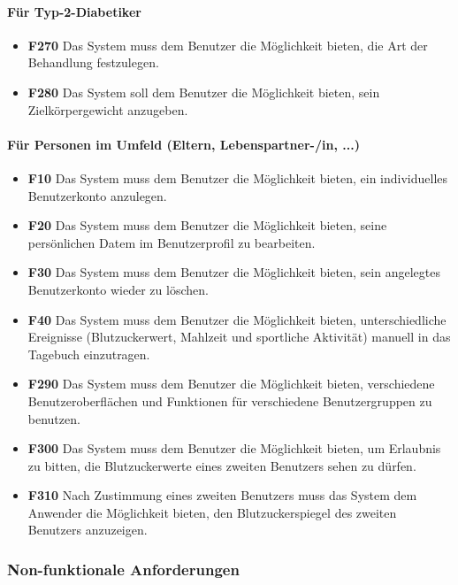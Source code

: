 	\paragraph{Für Typ-2-Diabetiker}\mbox{}
	\begin{itemize}
		\item\textbf{\lbrack F270\rbrack} Das System muss dem Benutzer die Möglichkeit bieten, die Art der Behandlung festzulegen.
		\item\textbf{\lbrack F280\rbrack} Das System soll dem Benutzer die Möglichkeit bieten, sein Zielkörpergewicht anzugeben.
	\end{itemize}
	\paragraph{Für Personen im Umfeld (Eltern, Lebenspartner-/in, ...)}\mbox{}
	\begin{itemize}
		\item\textbf{\lbrack F10\rbrack} Das System muss dem Benutzer die Möglichkeit bieten, ein individuelles Benutzerkonto anzulegen.
		\item\textbf{\lbrack F20\rbrack} Das System muss dem Benutzer die Möglichkeit bieten, seine persönlichen Datem im Benutzerprofil zu bearbeiten.
		\item\textbf{\lbrack F30\rbrack} Das System muss dem Benutzer die Möglichkeit bieten, sein angelegtes Benutzerkonto wieder zu löschen.
		\item\textbf{\lbrack F40\rbrack} Das System muss dem Benutzer die Möglichkeit bieten, unterschiedliche Ereignisse (Blutzuckerwert, Mahlzeit und sportliche Aktivität) manuell in das Tagebuch einzutragen.
		\item\textbf{\lbrack F290\rbrack} Das System muss dem Benutzer die Möglichkeit bieten, verschiedene Benutzeroberflächen und Funktionen für verschiedene Benutzergruppen zu benutzen.
		\item\textbf{\lbrack F300\rbrack} Das System muss dem Benutzer die Möglichkeit bieten, um Erlaubnis zu bitten, die Blutzuckerwerte eines zweiten Benutzers sehen zu dürfen.
		\item\textbf{\lbrack F310\rbrack} Nach Zustimmung eines zweiten Benutzers muss das System dem Anwender die Möglichkeit bieten, den Blutzuckerspiegel des zweiten Benutzers anzuzeigen.
	\end{itemize}
\subsubsection{Non-funktionale Anforderungen}
\label{section:nfAnforderungen}
